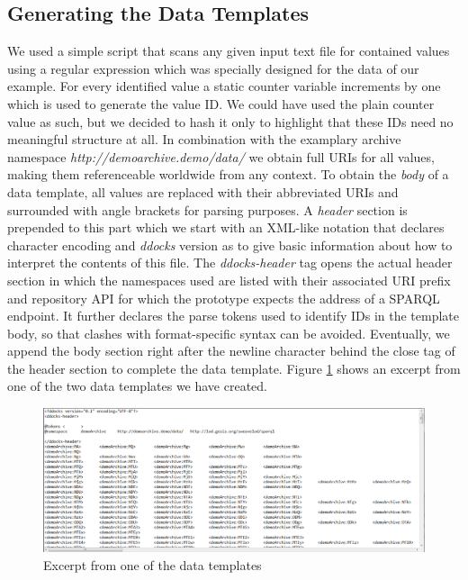\documentclass{acm_proc_article-sp}
\begin{document}
\subsection{Generating the Data Templates}

We used a simple script that scans any given input text file for contained values using a regular expression which was specially designed for the data of our example.
For every identified value a static counter variable increments by one which is used to generate the value ID.
We could have used the plain counter value as such, but we decided to hash it only to highlight that these IDs need no meaningful structure at all.
In combination with the examplary archive namespace \textit{http://demoarchive.demo/data/} we obtain full URIs for all values, making them referenceable worldwide from any context.
To obtain the \textit{body} of a data template, all values are replaced with their abbreviated URIs and surrounded with angle brackets for parsing purposes.
A \textit{header} section is prepended to this part which we start with an XML-like notation that declares character encoding and \textit{ddocks} version as to give basic information about how to interpret the contents of this file.
The \textit{ddocks-header} tag opens the actual header section in which the namespaces used are listed with their associated URI prefix and repository API for which the prototype expects the address of a SPARQL endpoint.
It further declares the parse tokens used to identify IDs in the template body, so that clashes with format-specific syntax can be avoided.
Eventually, we append the body section right after the newline character behind the close tag of the header section to complete the data template.
Figure \ref{fig:datatemplate} shows an excerpt from one of the two data templates we have created.



\begin{figure}[htb]
\centering
\includegraphics[width=.95\textwidth]{img/datatemplate.png}
\caption{
Excerpt from one of the data templates
}
\label{fig:datatemplate}
\end{figure}
\end{document}
